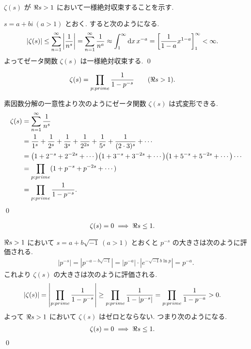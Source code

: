 \documentclass[uplatex,dvipdfmx,a4paper,11pt]{jlreq}
\makeatletter
\theoremstyle{definition}
\renewenvironment{proof}[1][\proofname]{\par
  \normalfont
  \topsep6\p@\@plus6\p@ \trivlist
  \item[\hskip\labelsep{\bfseries #1}\@addpunct{\bfseries}]\ignorespaces\quad\par
}{%
  \qed\endtrivlist\@endpefalse
}
\renewcommand\proofname{証明}
\makeatother
\begin{document}
\begin{proposition}
  $\zeta(s)$ が $\real s > 1$ において一様絶対収束することを示す.
\end{proposition}
\begin{proof}
  $s = a + bi\ (a > 1)$ とおく. すると次のようになる.
  \begin{align}
    |\zeta(s)| & \leq \sum_{n=1}^{\infty}\qty|\frac{1}{n^s}| = \sum_{n=1}^{\infty}\frac{1}{n^a} \approx \int_{1}^{\infty}\dd{x}x^{-a} = \qty[\frac{1}{1 - a}x^{1-a}]_1^\infty < \infty.
  \end{align}
  よってゼータ関数 $\zeta(s)$ は一様絶対収束する.
\end{proof}

\begin{proposition}
  \begin{align}
    \zeta(s) & = \prod_{p:prime}\frac{1}{1 - p^{-s}} \qquad (\real s > 1).
  \end{align}
\end{proposition}
\begin{proof}
  素因数分解の一意性より次のようにゼータ関数 $\zeta(s)$ は式変形できる.
  \begin{align}
    \zeta(s) & = \sum_{n=1}^{\infty}\frac{1}{n^s}                                                                                   \\
             & = \frac{1}{1^s} + \frac{1}{2^s} + \frac{1}{3^s} + \frac{1}{2^{2s}} + \frac{1}{5^s} + \frac{1}{(2\cdot 3)^s} + \cdots \\
             & = \qty(1 + 2^{-s} + 2^{-2s} + \cdots)\qty(1 + 3^{-s} + 3^{-2s} + \cdots)\qty(1 + 5^{-s} + 5^{-2s} + \cdots)\cdots    \\
             & = \prod_{p:prime}(1 + p^{-s} + p^{-2s} + \cdots)                                                                     \\
             & = \prod_{p:prime}\frac{1}{1 - p^{-s}}.
  \end{align}
\end{proof}

\begin{proposition}
  \begin{align}
    \zeta(s) & = 0 \implies \real s \leq 1.
  \end{align}
\end{proposition}
\begin{proof}
  $\real s > 1$ において $s = a + b\sqrt{-1}\ (a > 1)$ とおくと $p^{-s}$ の大きさは次のように評価される.
  \begin{align}
    |p^{-s}| = |p^{-a-b\sqrt{-1}}| = |p^{-a}|\cdot|e^{-\sqrt{-1}b\ln p}| = p^{-a}.
  \end{align}
  これより $\zeta(s)$ の大きさは次のように評価される.
  \begin{align}
    |\zeta(s)| & = \qty|\prod_{p:prime}\frac{1}{1 - p^{-s}}| \geq \prod_{p:prime}\frac{1}{1 - |p^{-s}|} = \prod_{p:prime}\frac{1}{1 - p^{-a}} > 0.
  \end{align}
  よって $\real s > 1$ において $\zeta(s)$ はゼロとならない. つまり次のようになる.
  \begin{align}
    \zeta(s) & = 0 \implies \real s \leq 1.
  \end{align}
\end{proof}
\end{document}
